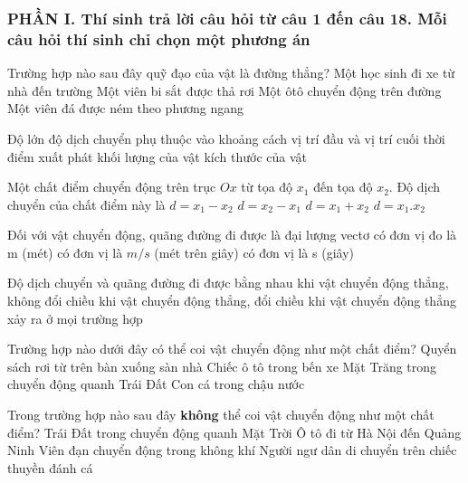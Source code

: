 \subsubsection*{PHẦN I. Thí sinh trả lời câu hỏi từ câu 1 đến câu 18. Mỗi câu hỏi thí sinh chỉ chọn một phương án}
\setcounter{ex}{0}
\begin{ex}%
Trường hợp nào sau đây quỹ đạo của vật là đường thẳng?
\choice
{Một học sinh đi xe từ nhà đến trường}
{\True Một viên bi sắt được thả rơi}
{Một ôtô chuyển động trên đường}
{Một viên đá được ném theo phương ngang}

\loigiai{
}
 \end{ex}
\begin{ex}%
Độ lớn độ dịch chuyển phụ thuộc vào
\choice
{\True khoảng cách vị trí đầu và vị trí cuối}
{thời điểm xuất phát}
{khối lượng của vật}
{kích thước của vật}
\loigiai{
}
 \end{ex}
\begin{ex}%
Một chất điểm chuyển động trên trục $Ox$ từ tọa độ $x_1$ đến tọa độ $x_2$. Độ dịch chuyển của chất điểm này là
\choice
{$d=x_1-x_2$}
{\True $d=x_2-x_1$}
{$d=x_1+x_2$}
{$d=x_1.x_2$}
\loigiai{
}
 \end{ex}
\begin{ex}%
Đối với vật chuyển động, quãng đường đi được
\choice
{là đại lượng vectơ}
{\True có đơn vị đo là m (mét)}
{có đơn vị là $m/s$ (mét trên giây)}
{có đơn vị là s (giây)}
\loigiai{
}
 \end{ex}
\begin{ex}%
Độ dịch chuyển và quãng đường đi được bằng nhau
\choice
{\True khi vật chuyển động thẳng, không đổi chiều}
{khi vật chuyển động thẳng, đổi chiều}
{khi vật chuyển động thẳng}
{xảy ra ở mọi trường hợp}

\loigiai{
}
\end{ex}
\begin{ex}%
Trường hợp nào dưới đây có thể coi vật chuyển động như một chất điểm?
\choice
{Quyển sách rơi từ trên bàn xuống sàn nhà}
{Chiếc ô tô trong bến xe}
{\True Mặt Trăng trong chuyển động quanh Trái Đất}
{Con cá trong chậu nước}
 \end{ex}	
\begin{ex}%
Trong trường hợp nào sau đây \textbf{không} thể coi vật chuyển động như một chất điểm?
\choice
{Trái Đất trong chuyển động quanh Mặt Trời}
{Ô tô đi từ Hà Nội đến Quảng Ninh}
{Viên đạn chuyển động trong không khí}
{\True Người ngư dân di chuyển trên chiếc thuyền đánh cá}
 \end{ex}	
